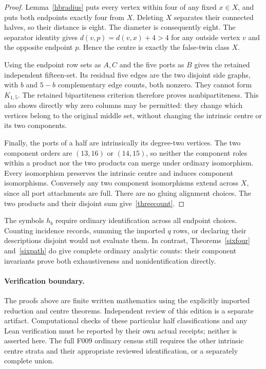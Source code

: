 \documentclass[11pt]{article}
\begin{document}
\begin{proof}
Lemma~\ref{hbradius} puts every vertex within four of any fixed
$x\in X$, and puts both endpoints exactly four from $X$. Deleting
$X$ separates their connected halves, so their distance is eight.
The diameter is consequently eight. The separator identity gives
$d(v,p)=d(v,x)+4>4$ for any outside vertex $v$ and the opposite endpoint
$p$. Hence the centre is exactly the false-twin class $X$.

Using the endpoint row sets as $A,C$ and the five ports as $B$ gives
the retained independent fifteen-set. Its residual five edges are
the two disjoint side graphs, with $b$ and $5-b$ complementary edge
counts, both nonzero. They cannot form $K_{1,5}$. The retained
bipartiteness criterion therefore proves nonbipartiteness. This also
shows directly why zero columns may be permitted: they change which
vertices belong to the original middle set, without changing the
intrinsic centre or its two components.

Finally, the ports of a half are intrinsically its degree-two vertices.
The two component orders are $(13,16)$ or $(14,15)$, so neither the
component roles within a product nor the two products can merge under
ordinary isomorphism. Every isomorphism preserves the intrinsic centre
and induces component isomorphisms. Conversely any two component
isomorphisms extend across $X$, since all port attachments are full.
There are no gluing alignment choices. The two products and their
disjoint sum give~\eqref{threecount}.
\end{proof}

The symbols $h_b$ require ordinary identification across all endpoint
choices. Counting incidence records, summing the imported $q$ rows,
or declaring their descriptions disjoint would not evaluate them.
In contrast, Theorems~\ref{sixfour} and~\ref{sixpath} do give complete
ordinary analytic counts: their component invariants prove both
exhaustiveness and nonidentification directly.

\paragraph{Verification boundary.}
The proofs above are finite written mathematics using the explicitly
imported reduction and centre theorems. Independent review of this
edition is a separate artifact. Computational checks of these particular
half classifications and any Lean verification must be reported by their
own actual receipts; neither is asserted here. The full F009 ordinary
census still requires the other intrinsic centre strata and their
appropriate reviewed identification, or a separately complete union.
\end{document}

